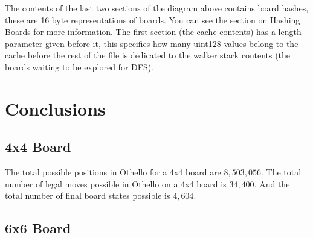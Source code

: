 \documentclass{article}
\begin{document}
The contents of the last two sections of the diagram above contains board hashes, these are 16 byte representations of boards. You can see the section on Hashing Boards for more information. The first section (the cache contents) has a length parameter given before it, this specifies how many uint128 values belong to the cache before the rest of the file is dedicated to the walker stack contents (the boards waiting to be explored for DFS).

\newpage

\section{Conclusions}

\subsection{4x4 Board}

The total possible positions in Othello for a 4x4 board are $8,503,056$.\cite{wiki} The total number of legal moves possible in Othello on a 4x4 board is $34,400$. And the total number of final board states possible is $4,604$.

\subsection{6x6 Board}



\newpage
\printbibliography[title={Bibliography}]
\end{document}
